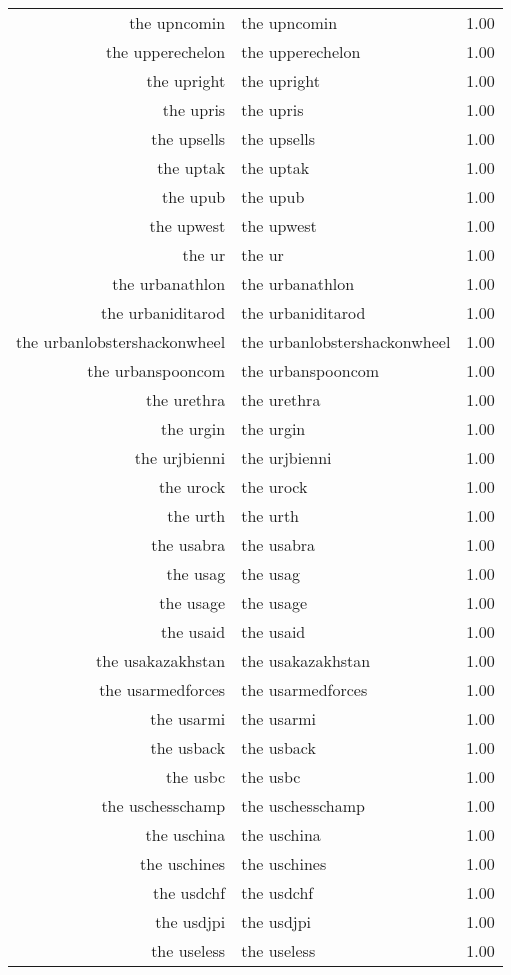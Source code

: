 \begin{table}[ht]
\begin{tabular}{rlr}
  the upncomin & the upncomin & 1.00 \\ 
  the upperechelon & the upperechelon & 1.00 \\ 
  the upright & the upright & 1.00 \\ 
  the upris & the upris & 1.00 \\ 
  the upsells & the upsells & 1.00 \\ 
  the uptak & the uptak & 1.00 \\ 
  the upub & the upub & 1.00 \\ 
  the upwest & the upwest & 1.00 \\ 
  the ur & the ur & 1.00 \\ 
  the urbanathlon & the urbanathlon & 1.00 \\ 
  the urbaniditarod & the urbaniditarod & 1.00 \\ 
  the urbanlobstershackonwheel & the urbanlobstershackonwheel & 1.00 \\ 
  the urbanspooncom & the urbanspooncom & 1.00 \\ 
  the urethra & the urethra & 1.00 \\ 
  the urgin & the urgin & 1.00 \\ 
  the urjbienni & the urjbienni & 1.00 \\ 
  the urock & the urock & 1.00 \\ 
  the urth & the urth & 1.00 \\ 
  the usabra & the usabra & 1.00 \\ 
  the usag & the usag & 1.00 \\ 
  the usage & the usage & 1.00 \\ 
  the usaid & the usaid & 1.00 \\ 
  the usakazakhstan & the usakazakhstan & 1.00 \\ 
  the usarmedforces & the usarmedforces & 1.00 \\ 
  the usarmi & the usarmi & 1.00 \\ 
  the usback & the usback & 1.00 \\ 
  the usbc & the usbc & 1.00 \\ 
  the uschesschamp & the uschesschamp & 1.00 \\ 
  the uschina & the uschina & 1.00 \\ 
  the uschines & the uschines & 1.00 \\ 
  the usdchf & the usdchf & 1.00 \\ 
  the usdjpi & the usdjpi & 1.00 \\ 
  the useless & the useless & 1.00 \\ 

\end{tabular}
\end{table}
